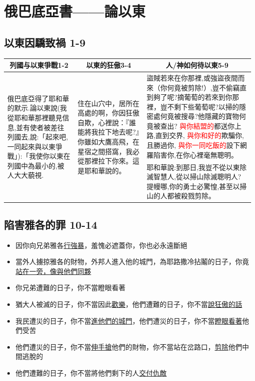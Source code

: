 \vspace{-5mm}
\chapter{俄巴底亞書——論以東}

\vspace{-3mm}

\section{以東因驕致禍 1-9}
\begin{table}[H]
\centering
\begin{tabular}{p{3.75cm}|p{3.50cm}|p{9.70cm}}\hline\hline
\multicolumn{1}{c|}{列國与以東爭戰1-2}&\multicolumn{1}{c|}{以東的狂傲3-4}&\multicolumn{1}{c}{人/神如何待以東5-9}\\\hline
\multirow{2}{4.1cm}{俄巴底亞得了耶和華的默示.論以東說(我從耶和華那裡聽見信息,並有使者被差往列國去,說:「起來吧,一同起來與以東爭戰」):「我使你以東在列國中為最小的,被人大大藐視.}
&\multirow{2}{3.79cm}{住在山穴中，居所在高處的啊，你因狂傲自欺，心裡說：『誰能將我拉下地去呢?』你雖如大鷹高飛，在星宿之間搭窩，我必從那裡拉下你來。這是耶和華說的。}
&盜賊若來在你那裡,或強盜夜間而來（你何竟被剪除!）,豈不偷竊直到夠了呢?摘葡萄的若來到你那裡，豈不剩下些葡萄呢?以掃的隱密處何竟被搜尋?他隱藏的寶物何竟被查出?
\textcolor{red}{與你結盟的}都送你上路,直到交界,
\textcolor{red}{與你和好的}欺騙你,且勝過你,
\textcolor{red}{與你一同吃飯的}設下網羅陷害你,在你心裡毫無聰明。\\\cline{3-3}
&&耶和華說:到那日,我豈不從以東除滅智慧人,從以掃山除滅聰明人?提幔哪,你的勇士必驚惶,甚至以掃山的人都被殺戮剪除。\\\hline
\end{tabular}
\end{table}


\section{陷害雅各的罪 10-14}
\begin{itemize} 
\itemsep-.5em 
\item 因你向兄弟雅各\underline{行強暴}，羞愧必遮蓋你，你也必永遠斷絕
\item 當外人擄掠雅各的財物，外邦人進入他的城門，為耶路撒冷拈鬮的日子，你竟\underline{站在一旁，像與他們同夥}
\item 你兄弟遭難的日子，你不當瞪眼看著
\item 猶大人被滅的日子，你不當因此\underline{歡樂}，他們遭難的日子，你不當\underline{說狂傲的話}
\item 我民遭災的日子，你不當\underline{進他們的城門}，他們遭災的日子，你不當\underline{瞪眼看著}他們受苦
\item 他們遭災的日子，你不當\underline{伸手搶}他們的財物，你不當站在岔路口，\underline{剪除}他們中間逃脫的
\item 他們遭難的日子，你不當將他們剩下的人\underline{交付仇敵}
\end{itemize}



